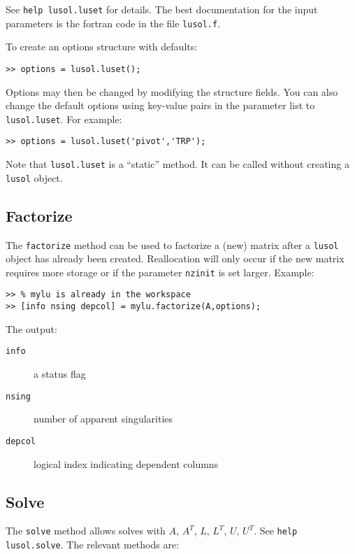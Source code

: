 \documentclass[11pt]{article}
\newcommand{\T}{^T}
\begin{document}
See \texttt{help lusol.luset} for details.  The best documentation for
the input parameters is the fortran code in the file \texttt{lusol.f}.

To create an options structure with defaults:

\begin{verbatim}
>> options = lusol.luset();
\end{verbatim}

Options may then be changed by modifying the structure fields.  You
can also change the default options using key-value pairs in the
parameter list to \texttt{lusol.luset}.  For example:

\begin{verbatim}
>> options = lusol.luset('pivot','TRP');
\end{verbatim}

Note that \texttt{lusol.luset} is a ``static'' method.  It can be
called without creating a \texttt{lusol} object.

\subsection{Factorize}

The \texttt{factorize} method can be used to factorize a (new) matrix
after a \texttt{lusol} object has already been created.  Reallocation
will only occur if the new matrix requires more storage or if the
parameter \texttt{nzinit} is set larger. Example:

\begin{verbatim}
>> % mylu is already in the workspace
>> [info nsing depcol] = mylu.factorize(A,options);
\end{verbatim}

The output:
\begin{description}
\item[\tt info] a status flag
\item[\tt nsing] number of apparent singularities
\item[\tt depcol] logical index indicating dependent columns
\end{description}

\subsection{Solve}

The \texttt{solve} method allows solves with $A$, $A\T$, $L$, $L\T$,
$U$, $U\T$.  See \texttt{help lusol.solve}.  The relevant methods are:
\end{document}
